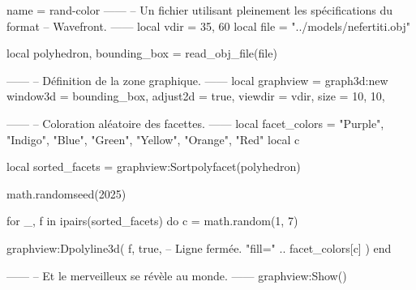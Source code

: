\documentclass{standalone}
\begin{document}
\begin{luadraw}{name = rand-color}
------
-- Un fichier utilisant pleinement les spécifications du format
-- Wavefront.
------
local vdir = {35, 60}
local file = "../models/nefertiti.obj"

local polyhedron, bounding_box = read_obj_file(file)

------
-- Définition de la zone graphique.
------
local graphview = graph3d:new{
  window3d = bounding_box,
  adjust2d = true,
  viewdir  = vdir,
  size     = {10, 10},
}

------
-- Coloration aléatoire des facettes.
------
local facet_colors = {"Purple", "Indigo", "Blue", "Green", "Yellow", "Orange", "Red"}
local c

local sorted_facets = graphview:Sortpolyfacet(polyhedron)

math.randomseed(2025)

for _, f in ipairs(sorted_facets) do
  c = math.random(1, 7)

  graphview:Dpolyline3d(
    f,
    true,  -- Ligne fermée.
    "fill=" .. facet_colors[c]
  )
end

------
-- Et le merveilleux se révèle au monde.
------
graphview:Show()
\end{luadraw}
\end{document}
